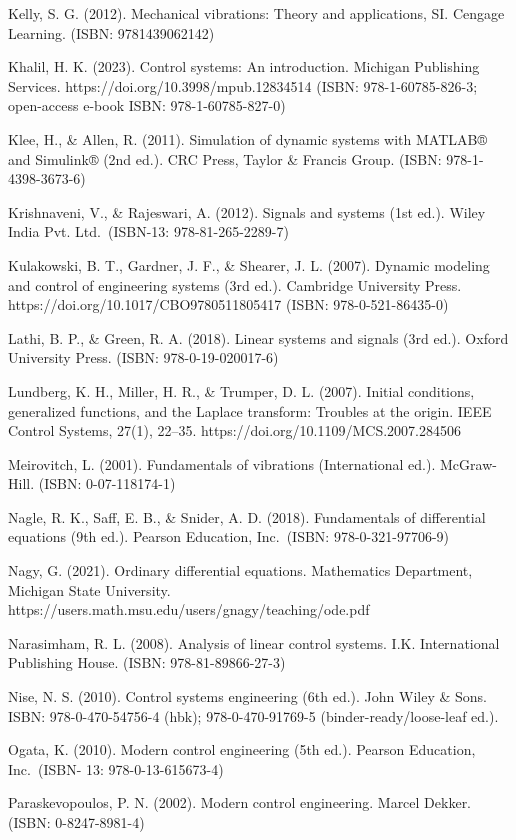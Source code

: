 \documentclass[
  11pt,
]{article}
\begin{document}
Kelly, S. G. (2012). Mechanical vibrations: Theory and applications, SI.
Cengage Learning. (ISBN: 9781439062142)

Khalil, H. K. (2023). Control systems: An introduction. Michigan
Publishing Services. https://doi.org/10.3998/mpub.12834514 (ISBN:
978-1-60785-826-3; open-access e-book ISBN: 978-1-60785-827-0)

Klee, H., \& Allen, R. (2011). Simulation of dynamic systems with
MATLAB® and Simulink® (2nd ed.). CRC Press, Taylor \& Francis Group.
(ISBN: 978-1-4398-3673-6)

Krishnaveni, V., \& Rajeswari, A. (2012). Signals and systems (1st ed.).
Wiley India Pvt. Ltd.~(ISBN-13: 978-81-265-2289-7)

Kulakowski, B. T., Gardner, J. F., \& Shearer, J. L. (2007). Dynamic
modeling and control of engineering systems (3rd ed.). Cambridge
University Press. https://doi.org/10.1017/CBO9780511805417 (ISBN:
978-0-521-86435-0)

Lathi, B. P., \& Green, R. A. (2018). Linear systems and signals (3rd
ed.). Oxford University Press. (ISBN: 978-0-19-020017-6)

Lundberg, K. H., Miller, H. R., \& Trumper, D. L. (2007). Initial
conditions, generalized functions, and the Laplace transform: Troubles
at the origin. IEEE Control Systems, 27(1), 22--35.
https://doi.org/10.1109/MCS.2007.284506

Meirovitch, L. (2001). Fundamentals of vibrations (International ed.).
McGraw-Hill. (ISBN: 0-07-118174-1)

Nagle, R. K., Saff, E. B., \& Snider, A. D. (2018). Fundamentals of
differential equations (9th ed.). Pearson Education, Inc.~(ISBN:
978-0-321-97706-9)

Nagy, G. (2021). Ordinary differential equations. Mathematics
Department, Michigan State University.
https://users.math.msu.edu/users/gnagy/teaching/ode.pdf

Narasimham, R. L. (2008). Analysis of linear control systems. I.K.
International Publishing House. (ISBN: 978-81-89866-27-3)

Nise, N. S. (2010). Control systems engineering (6th ed.). John Wiley \&
Sons. ISBN: 978-0-470-54756-4 (hbk); 978-0-470-91769-5
(binder-ready/loose-leaf ed.).

Ogata, K. (2010). Modern control engineering (5th ed.). Pearson
Education, Inc.~(ISBN- 13: 978-0-13-615673-4)

Paraskevopoulos, P. N. (2002). Modern control engineering. Marcel
Dekker. (ISBN: 0-8247-8981-4)
\end{document}
